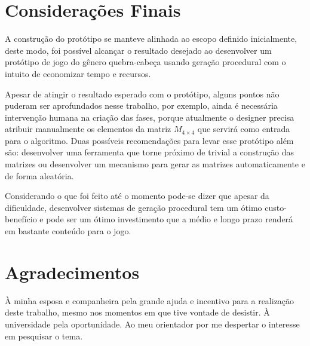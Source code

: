 \documentclass[10pt, conference, compsocconf]{IEEEtran}
\begin{document}
\section{Considerações Finais}

A construção do protótipo se manteve alinhada ao escopo definido inicialmente, deste modo, foi possível alcançar o resultado desejado ao desenvolver um protótipo de jogo do gênero quebra-cabeça usando geração procedural com o intuito de economizar tempo e recursos.

Apesar de atingir o resultado esperado com o protótipo, alguns pontos não puderam ser aprofundados nesse trabalho, por exemplo, ainda é necessária intervenção humana na criação das fases, porque atualmente o designer precisa atribuir manualmente os elementos da matriz $M_{4 \times 4}$ que servirá como entrada para o algoritmo. Duas possíveis recomendações para levar esse protótipo além são: desenvolver uma ferramenta que torne próximo de trivial a construção das matrizes ou desenvolver um mecanismo para gerar as matrizes automaticamente e de forma aleatória.

Considerando o que foi feito até o momento pode-se dizer que apesar da dificuldade, desenvolver sistemas de geração procedural tem um ótimo custo-benefício e pode ser um ótimo investimento que a médio e longo prazo renderá em bastante conteúdo para o jogo. 

\section*{Agradecimentos}

À minha esposa e companheira pela grande ajuda e incentivo para a realização deste trabalho, mesmo nos momentos em que tive vontade de desistir. À universidade pela oportunidade. Ao meu orientador por me despertar o interesse em pesquisar o tema.

\printbibliography
\end{document}
